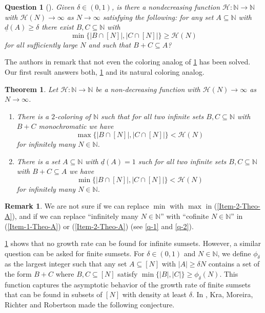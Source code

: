 \documentclass[letter, 11pt]{article}
\theoremstyle{plain} %
\newtheorem{question}[theorem]{Question}
\theoremstyle{definition} %
\newtheorem{remark}[theorem]{Remark}
\theoremstyle{plain}
\newcounter{MainTheoremCounter}
\newtheorem{maintheorem}[MainTheoremCounter]{Theorem}
\theoremstyle{plain}
\newcommand{\N}{\mathbb{N}}
\newcommand{\1}{\mathbbm{1}}
\begin{document}
\begin{question}[{\cite[Question 4.9]{Kra_Moreira_Richter_Robertson_problems}}]\label{Infinite_density_question}
    Given $\delta \in (0,1)$, is there a nondecreasing function $\mathcal{H}: \N \to \N$ with $\mathcal{H}(N) \to \infty$ as $N \to \infty$ satisfying the following: for any set $A \subseteq \N$ with $\underline{d}(A) \geq \delta$ there exist $B,C \subseteq \N$ with
        \[
        \min \{ |B \cap [N]|, |C \cap [N]| \} \geq \mathcal{H}(N)
        \]
    for all sufficiently large $N$ and such that $B+C \subseteq A$?
\end{question}
The authors in \cite{Kra_Moreira_Richter_Robertson_problems} remark that not even the coloring analog of \cref{Infinite_density_question} has been solved. Our first result answers both, \cref{Infinite_density_question} and its natural coloring analog.
\begin{maintheorem}\label{No-growth-rate-for-infinite-sumsets}
    Let $\mathcal{H} : \N \to \N$ be a non-decreasing function with $\mathcal{H} (N) \to \infty $ as $N \to \infty$. 
    \begin{enumerate}
    \item\label{Item-1-Theo-A} There is a $2$-coloring of $\N$ such that for all two infinite sets $B,C\subseteq \N$ with $B+C$ monochromatic we have
    $$\max\{|B\cap [N]|, |C\cap [N]|\} < \mathcal{H}(N) $$
    for infinitely many $N\in \N$.
    \item\label{Item-2-Theo-A} There is a set $A \subseteq \N$ with $\underline{d}(A) = 1$ such for all two infinite sets $B,C \subseteq \N$ with $B+C \subseteq A$ we have 
        \[
         \min{ \{|B \cap [N]|, |C \cap [N]| \}}<\mathcal{H}(N)
        \]
        for infinitely many $N\in \N$.
    \end{enumerate}
 
\end{maintheorem}
\begin{remark}
   We are not sure if we can replace $\min$ with $\max$ in (\ref{Item-2-Theo-A}), and if we can replace ``infinitely many $N\in \N$''  with ``cofinite $N\in \N$'' in (\ref{Item-1-Theo-A}) or (\ref{Item-2-Theo-A}) (see \cref{q-1} and \cref{q-2}).
\end{remark}

\cref{No-growth-rate-for-infinite-sumsets} shows that no growth rate can be found for infinite sumsets. However, a similar question can be asked for finite sumsets. For $\delta \in (0,1)$ and $N\in \N$, we define $\phi_{\delta}$ as the largest integer such that any set $A \subseteq [N]$ with $|A| \geq \delta N$ contains a set of the form $B+C$ where $B,C \subseteq [N]$ satisfy $\min\{|B|,|C|\} \geq \phi_{\delta}(N)$. This function captures the asymptotic behavior of the growth rate of finite sumsets that can be found in subsets of $[N]$ with density at least $\delta$. In \cite{Kra_Moreira_Richter_Robertson_problems}, Kra, Moreira, Richter and Robertson made the following conjecture.
\end{document}
